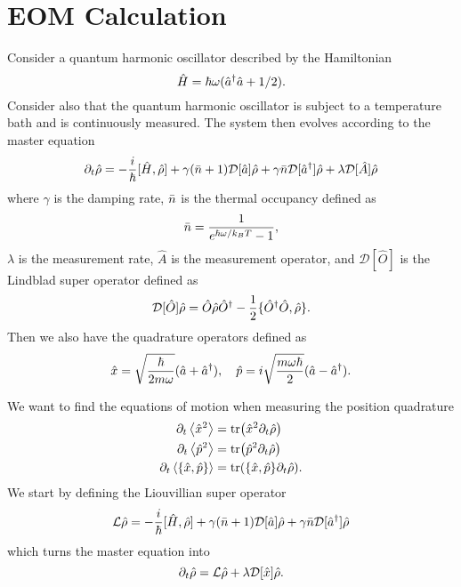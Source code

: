 \section{EOM Calculation}\label{app:eom}
Consider a quantum harmonic oscillator described by the Hamiltonian
\begin{equation}
    \hat{H} = \hbar \omega ( \hat{a}^{\dagger} \hat{a} + 1/2 ).
\end{equation}
Consider also that the quantum harmonic oscillator is subject to a temperature bath and is continuously measured. The system then evolves according to the master equation
\begin{equation}
    \partial_t \hat{\rho} = -\frac{i}{\hbar} [\hat{H}, \hat{\rho}] + \gamma (\bar{n} + 1 ) \mathcal{D}[\hat{a}] \hat{\rho} + \gamma \bar{n} \mathcal{D}[\hat{a}^{\dagger}] \hat{\rho} + \lambda \mathcal{D}[\hat{A}] \hat{\rho} \label{eq:master}
\end{equation}
where $\gamma$ is the damping rate, $\bar{n}$ is the thermal occupancy defined as 
\begin{equation}
    \bar{n} = \frac{1}{e^{\hbar \omega / k_B T} - 1},
\end{equation}
$\lambda$ is the measurement rate, $\hat{A}$ is the measurement operator, and $\mathcal{D}[\hat{O}]$ is the Lindblad super operator defined as
\begin{equation}
    \mathcal{D}[\hat{O}] \hat{\rho} = \hat{O} \hat{\rho} \hat{O}^\dagger - \frac{1}{2} \{ \hat{O}^\dagger \hat{O}, \hat{\rho} \}.
\end{equation}
Then we also have the quadrature operators defined as 
\begin{equation}
    \hat{x} = \sqrt{\frac{\hbar}{2 m \omega}} (\hat{a} + \hat{a}^{\dagger}), \quad \hat{p} = i \sqrt{\frac{m \omega \hbar}{2}} (\hat{a} - \hat{a}^{\dagger}).
\end{equation}

We want to find the equations of motion when measuring the position quadrature
\begin{align}
    \dt\expval{\xop^2} &= \tr(\xop^2 \dt \dmatrix)\label{eq:x2} \\
    \dt\expval{\pop^2} &= \tr(\pop^2 \dt \dmatrix)\label{eq:p2}\\
    \dt\expval{\acomm{\xop}{\pop}} &= \tr(\acomm{\xop}{\pop} \dt \dmatrix). \label{eq:xp}
\end{align}
We start by defining the Liouvillian super operator
\begin{equation}
    \mathcal{L}\hat{\rho} = -\frac{i}{\hbar} [\hat{H}, \hat{\rho}] + \gamma (\bar{n} + 1 ) \mathcal{D}[\hat{a}] \hat{\rho} + \gamma \bar{n} \mathcal{D}[\hat{a}^{\dagger}] \hat{\rho}
\end{equation}
which turns the master equation into
\begin{equation}
    \partial_t \hat{\rho} = \mathcal{L}\hat{\rho} + \lambda \mathcal{D}[\hat{x}] \hat{\rho}.
\end{equation}
